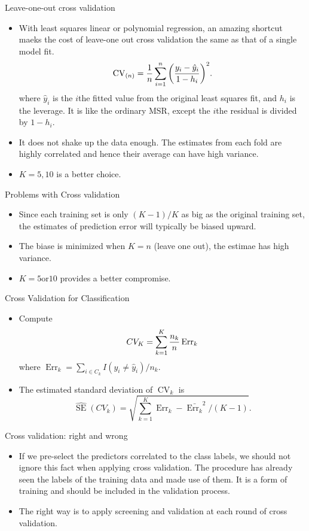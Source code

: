 \documentclass[11pt, a4paper]{article}
\begin{document}
Leave-one-out cross validation
\begin{itemize}
  \item With least squares linear or polynomial regression, an amazing shortcut maeks the cost of leave-one out cross validation the same as that of a single model fit. 
\[
  \operatorname{CV}_{(n)}={1\over n}\sum_{i=1}^n\bigg(\frac{y_i-\hat{y}_i}{1-h_i}\bigg)^2.
\]
where $\hat{y}_i$ is the $i$the fitted value from the original least squares fit, and $h_i$ is the leverage. It is like the ordinary MSR, except the $i$the residual is divided by $1-h_i$.
\item It does not shake up the data enough. The estimates from each fold are highly correlated and hence their average can have high variance.
\item $K=5, 10$ is a better choice.
\end{itemize}
  Problems with Cross validation
\begin{itemize}
\item Since each training set is only $(K-1)/K$ as big as the original training set, the estimates of prediction error will typically be biased upward.
\item The biase is minimized when $K=n$ (leave one out), the estimae has high variance.
\item $K=5 \text{or} 10$ provides a better compromise.
\end{itemize}
Cross Validation for Classification
\begin{itemize}
\item Compute
  \[
    CV_K=\sum_{k=1}^K{n_k\over n}\operatorname{Err}_k
  \]
  where $\operatorname{Err}_k=\sum_{i\in C_k}I(y_i\neq \hat{y}_i)/n_k$.
\item The estimated standard deviation of $\operatorname{CV}_k$ is 
\[
  \hat{\operatorname{SE}}(CV_k)=\sqrt{\sum_{k=1}^K\operatorname{Err}_k-\bar{\operatorname{Err}_k}^2/(K-1)}.
\]
\end{itemize}
Cross validation: right and wrong
\begin{itemize}
\item If we pre-select the predictors correlated to the class labels, we should not ignore this fact when applying cross validation. The procedure has already seen the labels of the training data and made use of them. It is a form of training and should be included in the validation process.
\item The right way is to apply screening and validation at each round of cross validation.
\end{itemize}
\end{document}
